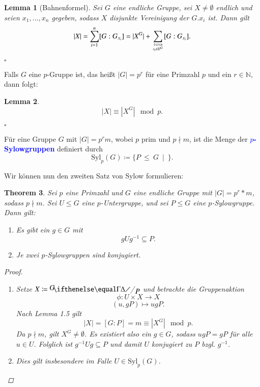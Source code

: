 \documentclass[a4paper,12pt]{scrartcl}
\newtheorem{Theorem}{Theorem}[section]
\newtheorem{Lemma}[Theorem]{Lemma}
\newcommand{\st}{\ \mid\ }
\newcommand{\N}{\mathbb N}
\newcommand{\df}[1]{\textcolor{blue}{\textbf{#1}}}
\begin{document}
	\begin{Lemma}[Bahnenformel]
		Sei $G$ eine endliche Gruppe, sei $X\neq\emptyset$ endlich und seien $x_{1},...,x_{n}$ gegeben, sodass $X$ disjunkte Vereinigung der $G.x_{i}$ ist. Dann gilt 
		$$|X|=\sum_{i=1}^{n}[G:G_{x_i}]=|X^{G}|+\sum\limits_{{1\leq i\leq n} \atop x_{i}\notin X^{G}} [G:G_{x_i}].$$
	\begin{flushright}
		$\square$
	\end{flushright}
	\end{Lemma}
	
	Falls $G$ eine $p$-Gruppe ist, das heißt $|G|=p^{r}$ für eine Primzahl $p$ und ein $r\in\N$, dann folgt:
	\begin{Lemma}
		$$|X| \equiv |X^{G}| \mod p.$$
	\begin{flushright}
		$\square$
	\end{flushright}
	\end{Lemma}
	Für eine Gruppe $G$ mit $|G|=p^{r}m$, wobei $p$ prim und $p\nmid m$, ist die Menge der \df{$p$-Sylowgruppen} definiert durch
	$$\text{Syl}_{p}(G)\coloneqq\{P\ \leq\ G\st \}.$$
	
	Wir können nun den zweiten Satz von Sylow formulieren:
	\begin{Theorem}
		Sei $p$ eine Primzahl und $G$ eine endliche Gruppe mit $|G|=p^{r}*m$, sodass $p\nmid m$. Sei $U \leq G$ eine $p$-Untergruppe, und sei $P \leq G$ eine $p$-Sylowgruppe. Dann gilt:
		\begin{enumerate}
			\item Es gibt ein $g\in G$ mit $$gUg^{-1}\subseteq P.$$
			\item Je zwei $p$-Sylowgruppen sind konjugiert.
		\end{enumerate}
	\begin{proof}
		\begin{enumerate}
			\item Setze $X\coloneqq\fkr{G}{P}$ und betrachte die Gruppenaktion
						$$\phi:U\times X\to X$$
						$$(u,gP)\mapsto ugP.$$
						Nach Lemma 1.5 gilt $$|X|=[G : P]=m\equiv |X^{G}| \mod p.$$
						Da $p\nmid m$, gilt $X^{G}\neq\emptyset$. Es existiert also ein $g\in G$, sodass $ugP=gP$ für alle $u\in U$.
						Folglich ist $g^{-1}Ug\subseteq P$ und damit $U$ konjugiert zu $P$ bzgl. $g^{-1}$.
			\item Dies gilt insbesondere im Falle $U\in \text{Syl}_{p}(G)$.
		\end{enumerate}
	\end{proof}
	\end{Theorem}
\end{document}
